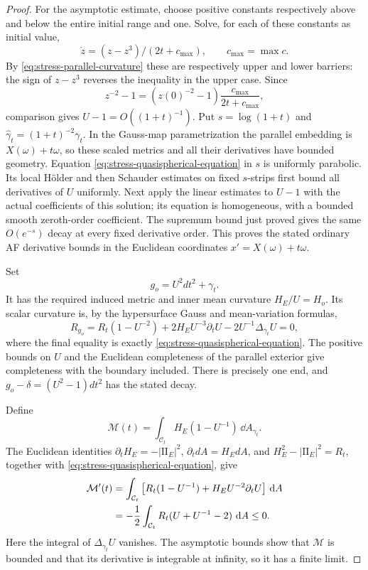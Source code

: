\begin{proof}
For the asymptotic estimate, choose positive constants respectively
above and below the entire initial range and one.  Solve, for each
of these constants as initial value,
\begin{equation}
 \dot z=(z-z^3)/(2t+c_{\max}),\qquad
 c_{\max}=\max c.
 \label{eq:stress-parabolic-barriers}
\end{equation}
By \eqref{eq:stress-parallel-curvature} these are respectively upper
and lower barriers: the sign of $z-z^3$ reverses the inequality in
the upper case.  Since
\[
 z^{-2}-1=(z(0)^{-2}-1)\frac{c_{\max}}{2t+c_{\max}},
\]
comparison gives $U-1=O((1+t)^{-1})$.
Put $s=\log(1+t)$ and $\widehat\gamma_t=(1+t)^{-2}\gamma_t$.
In the Gauss-map parametrization the parallel embedding is
$X(\omega)+t\omega$, so these scaled metrics and all their
derivatives have bounded geometry.  Equation
\eqref{eq:stress-quasispherical-equation} in $s$ is uniformly
parabolic.  Its local H\"older and then Schauder estimates on fixed
$s$-strips first bound all derivatives of $U$ uniformly.  Next apply
the linear estimates to $U-1$ with the actual coefficients of this
solution; its equation is homogeneous, with a bounded smooth
zeroth-order coefficient.  The supremum bound just proved gives
the same $O(e^{-s})$ decay at every fixed derivative order.  This
proves the stated ordinary AF derivative bounds in the Euclidean
coordinates $x'=X(\omega)+t\omega$.

Set
\begin{equation}
 g_o=U^2dt^2+\gamma_t.
 \label{eq:stress-af-extension-metric}
\end{equation}
It has the required induced metric and inner mean curvature
$H_E/U=H_o$.  Its scalar curvature is, by the hypersurface Gauss
and mean-variation formulas,
\begin{equation}
 R_{g_o}=R_t(1-U^{-2})+2H_EU^{-3}\partial_tU
                    -2U^{-1}\Delta_{\gamma_t}U=0,
 \label{eq:stress-af-scalar-zero}
\end{equation}
where the final equality is exactly
\eqref{eq:stress-quasispherical-equation}.  The positive bounds on
$U$ and the Euclidean completeness of the parallel exterior give
completeness with the boundary included.  There is precisely one
end, and $g_o-\delta=(U^2-1)dt^2$ has the stated decay.

Define
\[
 \mathcal M(t)=\int_{\mathcal C_t}H_E(1-U^{-1})\,\dd A_{\gamma_t}.
\]
The Euclidean identities
$\partial_tH_E=-|\mathrm{II}_E|^2$,
$\partial_t dA=H_EdA$, and
$H_E^2-|\mathrm{II}_E|^2=R_t$, together with
\eqref{eq:stress-quasispherical-equation}, give
\begin{align}
 \mathcal M'(t)
 &=\int_{\mathcal C_t}\left[
       R_t(1-U^{-1})+H_EU^{-2}\partial_tU\right]\,\mathop{}\!\mathrm d A\notag\\
 &=-\frac12\int_{\mathcal C_t}R_t(U+U^{-1}-2)\,\mathop{}\!\mathrm d A\le0.
 \label{eq:stress-shitam-monotonicity}
\end{align}
Here the integral of $\Delta_{\gamma_t}U$ vanishes.  The asymptotic
bounds show that $\mathcal M$ is bounded and that its derivative
is integrable at infinity, so it has a finite limit.


\end{proof}
